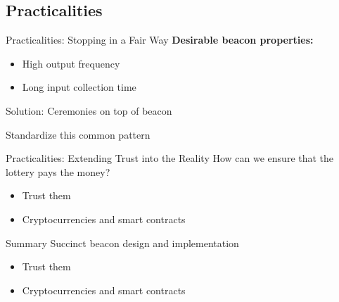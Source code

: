 \subsection{Practicalities}

\begin{frame}{Practicalities: Stopping in a Fair Way}
    \textbf{Desirable beacon properties:}
    \begin{itemize}
        \item High output frequency
        \item Long input collection time
    \end{itemize}

    \vspace{.7cm}
    \centering
    \pause
    Solution: Ceremonies on top of beacon

    \vspace{.3em}
    \pause
    Standardize this common pattern

\end{frame}

\begin{frame}{Practicalities: Extending Trust into the Reality}
    How can we ensure that the lottery pays the money?
    \pause
    \begin{itemize}
        \item Trust them
        \pause
        \item Cryptocurrencies and smart contracts
    \end{itemize}
\end{frame}

\begin{frame}{Summary}
    Succinct beacon design and implementation
    \pause
    \begin{itemize}
        \item Trust them
        \pause
        \item Cryptocurrencies and smart contracts
    \end{itemize}
\end{frame}
